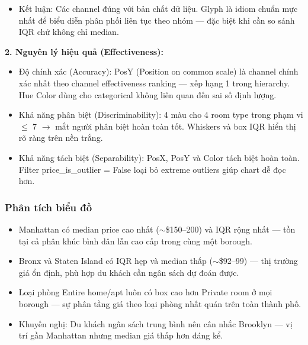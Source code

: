 \begin{itemize}
\begin{itemize}
        \item Ưu tiên 3 -- Màu sắc (Color Hue): Color Hue mã hóa Room Type (Categorical/Nominal) bằng màu sắc phân biệt cho từng loại phòng. Theo Mackinlay, Color Hue phù hợp nhất cho dữ liệu danh mục vì mỗi màu được cảm nhận là ngang hàng nhau, không ngụ ý thứ tự hay mức độ. Kênh này cho phép người xem đồng thời so sánh phân phối giá giữa các loại phòng trong cùng một borough mà không cần tách thành nhiều biểu đồ riêng biệt --- tăng mật độ thông tin mà không làm tăng độ phức tạp hiển thị, với điều kiện số màu $\leq$ 7 như hiện tại.
    \end{itemize}
    \item Kết luận: Các channel đúng với bản chất dữ liệu. Glyph là idiom chuẩn mực nhất để biểu diễn phân phối liên tục theo nhóm --- đặc biệt khi cần so sánh IQR chứ không chỉ median.
\end{itemize}

\textbf{2. Nguyên lý hiệu quả (Effectiveness):}

\begin{itemize}
    \item Độ chính xác (Accuracy): PosY (Position on common scale) là channel chính xác nhất theo channel effectiveness ranking --- xếp hạng 1 trong hierarchy. Hue Color dùng cho categorical không liên quan đến sai số định lượng.
    \item Khả năng phân biệt (Discriminability): 4 màu cho 4 room type trong phạm vi $\leq$ 7 $\rightarrow$ mắt người phân biệt hoàn toàn tốt. Whiskers và box IQR hiển thị rõ ràng trên nền trắng.
    \item Khả năng tách biệt (Separability): PosX, PosY và Color tách biệt hoàn toàn. Filter price\_is\_outlier = False loại bỏ extreme outliers giúp chart dễ đọc hơn.
\end{itemize}

\subsubsection{Phân tích biểu đồ}

\begin{itemize}
    \item Manhattan có median price cao nhất ($\sim$\$150--200) và IQR rộng nhất --- tồn tại cả phân khúc bình dân lẫn cao cấp trong cùng một borough.
    \item Bronx và Staten Island có IQR hẹp và median thấp ($\sim$\$92--99) --- thị trường giá ổn định, phù hợp du khách cần ngân sách dự đoán được.
    \item Loại phòng Entire home/apt luôn có box cao hơn Private room ở mọi borough --- sự phân tầng giá theo loại phòng nhất quán trên toàn thành phố.
    \item Khuyến nghị: Du khách ngân sách trung bình nên cân nhắc Brooklyn --- vị trí gần Manhattan nhưng median giá thấp hơn đáng kể.
\end{itemize}
